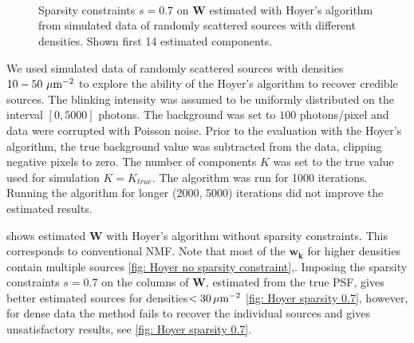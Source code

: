 \begin{figure}[htbp!] %
	\newcommand{\sizefig}{.9}
	\centering
	\\
	\\
	\\	
	\caption{Sparsity constraints $s=0.7$ on $\bm{W}$ estimated with Hoyer's algorithm from simulated data of randomly scattered sources with different densities. Shown first 14 estimated components.}
	\label{fig: Hoyer sparsity 0.7}
\end{figure}

We used simulated data of randomly scattered sources with densities $10-50\,\, \mathrm{\mu m}^{-2}$ to explore the ability of the Hoyer's algorithm to recover credible sources. The blinking intensity was assumed to be uniformly distributed on the interval $[0, 5000]$ photons. The background was set to $100$ photons/pixel and data were corrupted with Poisson noise. Prior to the evaluation with the Hoyer's algorithm, the true background value was subtracted from the data, clipping negative pixels to zero. The number of components $K$ was set to the true value used for simulation $K=K_{true}$. The algorithm was run for 1000 iterations. Running the algorithm for longer (2000, 5000) iterations did not improve the estimated results. 

 shows estimated $\bm{W}$ with Hoyer's algorithm without sparsity constraints. This corresponds to conventional NMF. Note that most of the $\bm{w_k}$ for higher densities contain multiple sources \autoref{fig: Hoyer no sparsity constraint}\bbb,\ccc. Imposing the sparsity constraints $s=0.7$ on the columns of $\bm{W}$, estimated from the true PSF, gives better estimated sources for densities$<30\, \mathrm{\mu m}^{-2}$  \autoref{fig: Hoyer sparsity 0.7}\aaa, however, for dense data the method fails to recover the individual sources and gives unsatisfactory results, see \autoref{fig: Hoyer sparsity 0.7}\ccc.

